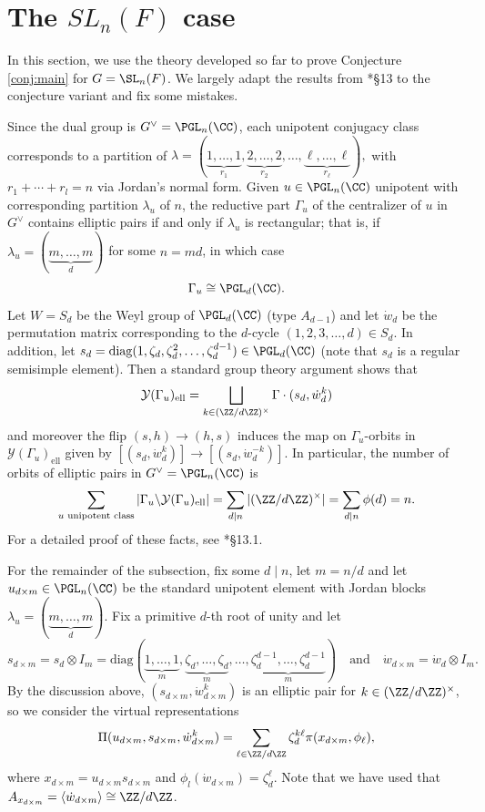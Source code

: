 \section{The \texorpdfstring{$SL_n(F)$}{PDFstring} case}
In this section, we use the theory developed so far to prove Conjecture \ref{conj:main} for $G=\SL_n(F)$. We largely adapt the results from \cite{AubertCiubotaruRomano2024}*{\S 13} to the conjecture variant and fix some mistakes.  

Since the dual group is $G^\vee=\PGL_n(\CC)$, each unipotent conjugacy class corresponds to a partition of $\lambda= (\underbrace{1,\ldots,1}_{r_1}, \underbrace{2,\ldots,2}_{r_2}, \ldots, \underbrace{\ell,\ldots,\ell}_{r_\ell}),$ with $r_1+\cdots+r_l=n$ via Jordan's normal form. Given $u\in\PGL_n(\CC)$ unipotent with corresponding partition $\lambda_u$ of $n$, the reductive part $\Gamma_u$ of the centralizer of $u$ in $G^\vee$ contains elliptic pairs if and only if $\lambda_u$ is rectangular; that is, if $\lambda_u=(\underbrace{m,\ldots,m}_{d})$ for some $n=md$, in which case 
\[
    \Gamma_u\cong\PGL_d(\CC).
\] 
Let $W=S_d$ be the Weyl group of $\PGL_d(\CC)$ (type $A_{d-1}$) and let $\dot{w}_d$ be the permutation matrix corresponding to the $d$-cycle $(1,2,3,\ldots,d)\in S_d$. In addition, let $s_d=\mathrm{diag}(1,\zeta_d,\zeta_d^2,\ldots,\zeta_d^{d-1})\in\PGL_d(\CC)$ (note that $s_d$ is a  regular semisimple element). Then a standard group theory argument shows that 
\[
    \mathcal{Y}(\Gamma_u)_{\mathrm{ell}}=\bigsqcup_{k\in(\ZZ/d\ZZ)^\times} \Gamma\cdot(s_d,\dot{w}_d^k)
\]
and moreover the flip $(s,h)\rightarrow(h,s)$ induces the map on $\Gamma_u$-orbits in $\mathcal{Y}(\Gamma_u)_{\mathrm{ell}}$ given by $[(s_d,\dot{w}_d^k)]\rightarrow[(s_d,\dot{w}_d^{-k})]$. In particular, the number of orbits of elliptic pairs in $G^\vee=\PGL_n(\CC)$ is 
\begin{equation*}
    \sum_{u\text{ unipotent class}}|\Gamma_u\backslash\mathcal{Y}(\Gamma_u)_{\mathrm{ell}}|=\sum_{d\mid n}|(\ZZ/d\ZZ)^\times|=\sum_{d\mid n}\phi(d)=n.
\end{equation*}
For a detailed proof of these facts, see \cite{AubertCiubotaruRomano2024}*{\S 13.1}.

For the remainder of the subsection, fix some $d\mid n$, let $m=n/d$ and let $u_{d\times m}\in\PGL_n(\CC)$ be the standard unipotent element with Jordan blocks $\lambda_u=(\underbrace{m,\ldots,m}_{d})$. Fix a primitive $d$-th root of unity and let $$s_{d\times m}=s_d\otimes I_m=\textrm{diag}(\underbrace{1,\ldots,1}_{m},\underbrace{\zeta_d,\ldots,\zeta_d}_{m},\ldots,\underbrace{\zeta_d^{d-1},\ldots,\zeta_d^{d-1}}_{m})\quad\text{and}\quad \dot{w}_{d\times m}=\dot{w}_d\otimes I_m.$$
By the discussion above, $(s_{d\times m},\dot{w}_{d\times m}^k)$ is an elliptic pair for $k\in(\ZZ/d\ZZ)^\times$, so we consider the virtual representations 
$$\Pi(u_{d\times m},s_{d\times m},\dot{w}^k_{d\times m})=\sum_{\ell\in\ZZ/d\ZZ}\zeta_d^{k\ell}\pi(x_{d\times m},\phi_\ell),$$
where $x_{d\times m}=u_{d\times m}s_{d\times m}$ and $\phi_l(\dot{w}_{d\times m})=\zeta^\ell_d$. Note that we have used that $A_{x_{d\times m}}=\langle\dot{w}_{d\times m}\rangle\cong\ZZ/d\ZZ$.

